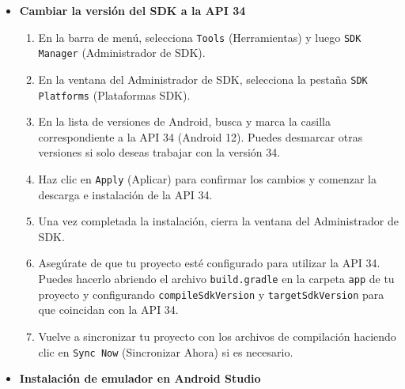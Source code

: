 \documentclass{article}
\begin{document}
\begin{itemize}
        \item \textbf{Cambiar la versión del SDK a la API 34}
            \begin{enumerate}
                \item En la barra de menú, selecciona \texttt{Tools} (Herramientas) y luego \texttt{SDK Manager} (Administrador de SDK).
                \item En la ventana del Administrador de SDK, selecciona la pestaña \texttt{SDK Platforms} (Plataformas SDK).
                \item En la lista de versiones de Android, busca y marca la casilla correspondiente a la API 34 (Android 12). Puedes desmarcar otras versiones si solo deseas trabajar con la versión 34.
                \item Haz clic en \texttt{Apply} (Aplicar) para confirmar los cambios y comenzar la descarga e instalación de la API 34.
                \item Una vez completada la instalación, cierra la ventana del Administrador de SDK.
                \item Asegúrate de que tu proyecto esté configurado para utilizar la API 34. Puedes hacerlo abriendo el archivo \texttt{build.gradle} en la carpeta \texttt{app} de tu proyecto y configurando \texttt{compileSdkVersion} y \texttt{targetSdkVersion} para que coincidan con la API 34.
                \item Vuelve a sincronizar tu proyecto con los archivos de compilación haciendo clic en \texttt{Sync Now} (Sincronizar Ahora) si es necesario.
            \end{enumerate}
    
        \item \textbf{Instalación de emulador en Android Studio}
            

\end{itemize}
\end{document}
